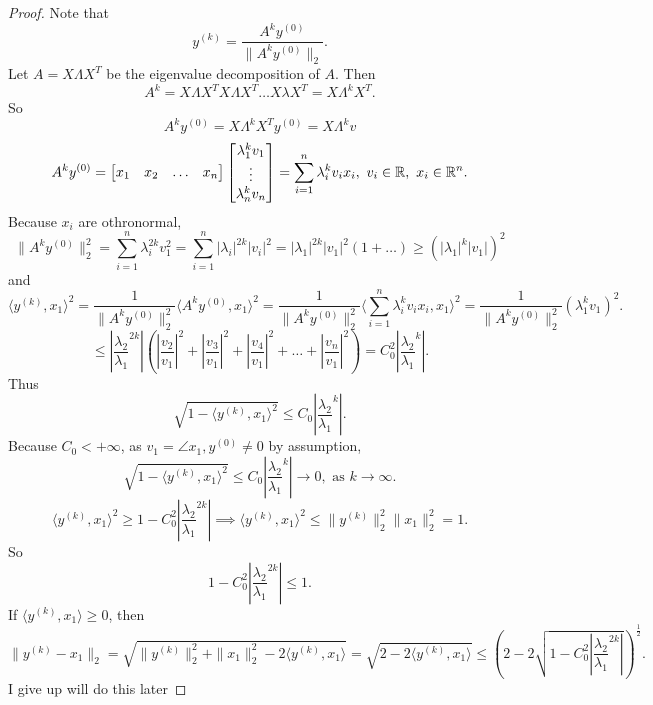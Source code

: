 \documentclass[../main/main.tex]{subfiles}
\begin{document}
\begin{proof}
	Note that \[
		y^{(k)}=\frac{A^{k}y^{(0)}}{\|A^{k}y^{(0)}\|_2}
	.\] 
	Let $A=X\Lambda X^{T}$ be the eigenvalue decomposition of $A$. Then  \[
		A^{k}=X\Lambda X^{T} X\Lambda X^{T}\ldots X\lambda X^{T}=X\Lambda^{k}X^{T}
	.\] So  \[
	A^{k}y^{(0)}=X\Lambda^{k}X^{T}y^{(0)}=X\Lambda^{k}v
	\] \[
	A^{k}y^{(0)}=\begin{bmatrix} x_1&x_2&\ldots&x_n \end{bmatrix}\begin{bmatrix} \lambda_1^{k} v_1\\ \vdots\\ \lambda_n^{k} v_n\end{bmatrix}=\sum_{i=1}^{n} \lambda_i^{k}v_ix_i,\ v_i\in \mathbb{R},\ x_i\in \mathbb{R}^{n} 
	.\] Because $x_i$ are othronormal,  \[
	\|A^{k}y^{(0)}\|^{2}_2=\sum_{i=1}^{n} \lambda^{2k}_i v^2_1 = \sum_{i=1}^{n} |\lambda_i|^{2k}|v_i|^{2}=|\lambda_1|^{2k}|v_1|^2\left( 1+\ldots \right)\ge \left( |\lambda_1|^{k}|v_1| \right)^2  
	\]  and  \[
	\langle y^{(k)}, x_1\rangle^2=\frac{1}{\|A^ky^{(0)}\|^2_2}\langle A^ky^{(0)},x_1\rangle^2=\frac{1}{\|A^ky^{(0)}\|^2_2}\langle \sum_{i=1}^{n} \lambda_i^{k}v_ix_i,x_1\rangle^2=\frac{1}{\|A^ky^{(0)}\|^2_2}\left( \lambda_1^{k}v_1 \right)^2 
	.\] 
\[
	\le \left| \frac{\lambda_2}{\lambda_1}^{2k} \right| \left( \left| \frac{v_2}{v_1} \right|^2+\left| \frac{v_3}{v_1} \right|^2+\left| \frac{v_4}{v_1} \right|^2+\ldots+ \left| \frac{v_n}{v_1} \right|^2\right) =C_0^2\left| \frac{\lambda_2}{\lambda_1}^{k} \right| 
.\] Thus  \[
\sqrt{1-\langle y^{(k)},x_1\rangle^2}\le C_0\left| \frac{\lambda_2}{\lambda_1}^{k} \right| 
.\] Because $C_0<+\infty$, as $v_1=\angle x_1,y^{(0)}\neq0$ by assumption, \[
\sqrt{1-\langle y^{(k)},x_1\rangle^2}\le C_0\left| \frac{\lambda_2}{\lambda_1}^{k} \right|\to 0, \text{ as } k \to \infty 
.\]\[
\langle y^{(k)},x_1\rangle^2\ge 1-C_0^2\left| \frac{\lambda_2}{\lambda_1}^{2k} \right| \implies \langle y^{(k)},x_1\rangle^2\le \|y^{(k)}\|^2_2\|x_1\|^2_2=1
.\] So \[
1-C_0^2\left| \frac{\lambda_2}{\lambda_1}^{2k} \right| \le 1
.\]  If $\langle y^{(k)},x_1\rangle\ge 0$, then  \[
\|y^{(k)}-x_1\|_2=\sqrt{\|y^{(k)}\|^2_2+\|x_1\|^2_2-2\langle y^{(k)},x_1\rangle}=\sqrt{2-2\langle y^{(k)},x_1\rangle}\le \left( 2-2\sqrt{1-C_0^2\left| \frac{\lambda_2}{\lambda_1}^{2k}  \right|}   \right) ^{\frac{1}{2}}
.\] I give up  will do this later
\end{proof}
\end{document}
